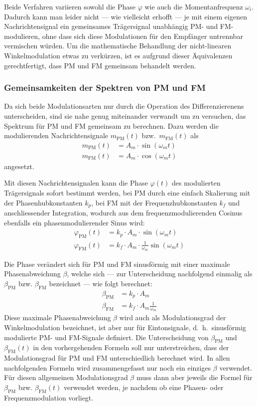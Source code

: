 Beide Verfahren variieren sowohl die Phase \(\varphi\) wie auch die
Momentanfrequenz \(\omega_i.\)
Dadurch kann man leider nicht --- wie vielleicht erhofft ---
je mit einem eigenen Nachrichtensignal ein gemeinsames Trägersignal
unabhängig PM- und FM-modulieren, ohne dass sich diese Modulationen
für den Empfänger untrennbar vermischen würden.
Um die mathematische Behandlung der nicht-linearen Winkelmodulation
etwas zu verkürzen, ist es aufgrund dieser Äquivalenzen gerechtfertigt,
dass PM und FM gemeinsam behandelt werden. 

\subsubsection{Gemeinsamkeiten der Spektren von PM und FM}
Da sich beide Modulationsarten nur durch die Operation des Differenzierenens
unterscheiden, sind sie nahe genug miteinander verwandt um zu versuchen,
das Spektrum für PM und FM gemeinsam zu berechnen.
Dazu werden die modulierenden Nachrichtensignale \(m_{\text{PM}}(t)\)
bzw.~\(m_{\text{FM}}(t)\) als
\begin{align}
m_{\text{PM}}(t)
&=
A_m \cdot \sin(\omega_m t)
\\
m_{\text{FM}}(t) 
&= 
A_m \cdot \cos(\omega_m t)
\end{align}
angesetzt.

Mit diesen Nachrichtensignalen kann die Phase \(\varphi(t)\) des
modulierten Trägersignals sofort bestimmt werden,
bei PM durch eine einfach Skalierung mit der Phasenhubkonstanten \(k_p\), 
bei FM mit der Frequenzhubkonstanten \(k_f\) und anschliessender Integration, 
wodurch aus dem frequenzmodulierenden Cosinus ebenfalls ein
phasenmodulierender Sinus wird:
\begin{align}
\varphi_{\text{PM}}(t)
&=
k_p \cdot A_m \cdot \sin(\omega_m t)
\\
\varphi_{\text{FM}}(t)
&=
k_f \cdot A_m \cdot \frac{1}{\omega_m} \sin(\omega_m t)
\end{align}

Die Phase verändert sich für PM und FM sinusförmig mit einer maximale
Phasenabweichung \(\beta\),
welche sich --- zur Unterscheidung nachfolgend einmalig als
\(\beta_{\text{PM}}\) bzw. \(\beta_{\text{FM}}\) bezeichnet ---
wie folgt berechnet:
 \begin{align}
\beta_{\text{PM}} &= k_p \cdot A_m
\\
\beta_{\text{FM}} &= k_f \cdot A_m \frac{1}{\omega_m} 
\end{align}
Diese maximale Phasenabweichung \(\beta\) wird auch als Modulationsgrad
der Winkelmodulation bezeichnet, ist aber nur für Eintonsignale,
d.~h.~sinusförmig modulierte PM- und FM-Signale definiert. 
Die Unterscheidung von \(\beta_{\text{PM}}\) und \(\beta_{\text{FM}}(t)\)
in den vorhergehenden Formeln soll nur unterstreichen, dass
der Modulationsgrad für PM und FM unterschiedlich berechnet wird.
In allen nachfolgenden Formeln wird zusammengefasst nur noch ein einziges
\(\beta\) verwendet. 
Für diesen allgemeinen Modulationsgrad \(\beta\) muss dann aber jeweils
die Formel für \(\beta_{\text{PM}}\) bzw. \(\beta_{\text{FM}}(t)\)
verwendet werden, je nachdem ob eine Phasen- oder Frequenzmodulation
vorliegt.


